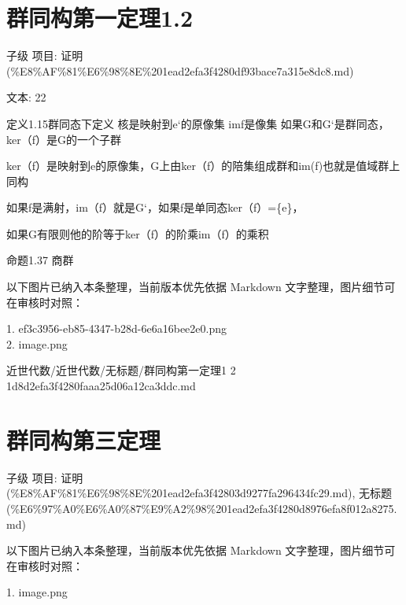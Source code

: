 \section*{群同构第一定理1.2}

\begin{theorem}[群同构第一定理1.2]

子级 项目: 证明 (\%E8\%AF\%81\%E6\%98\%8E\%201ead2efa3f4280df93bace7a315e8dc8.md)

文本: 22

定义1.15群同态下定义 核是映射到e‘的原像集 imf是像集 如果G和G‘是群同态，ker（f）是G的一个子群

ker（f）是映射到e的原像集，G上由ker（f）的陪集组成群和im(f)也就是值域群上同构

如果f是满射，im（f）就是G‘，如果f是单同态ker（f）=\{e\}，

如果G有限则他的阶等于ker（f）的阶乘im（f）的乘积

命题1.37 商群

\end{theorem}

\begin{note}[关联图片]
以下图片已纳入本条整理，当前版本优先依据 Markdown 文字整理，图片细节可在审核时对照：

1. ef3c3956-eb85-4347-b28d-6e6a16bee2e0.png\\
2. image.png\\

\end{note}

\begin{note}[来源路径]

近世代数/近世代数/无标题/群同构第一定理1 2 1d8d2efa3f4280faaa25d06a12ca3ddc.md

\end{note}

\section*{群同构第三定理}

\begin{theorem}[群同构第三定理]

子级 项目: 证明 (\%E8\%AF\%81\%E6\%98\%8E\%201ead2efa3f42803d9277fa296434fc29.md), 无标题 (\%E6\%97\%A0\%E6\%A0\%87\%E9\%A2\%98\%201ead2efa3f4280d8976efa8f012a8275.md)

\end{theorem}

\begin{note}[关联图片]
以下图片已纳入本条整理，当前版本优先依据 Markdown 文字整理，图片细节可在审核时对照：

1. image.png\\

\end{note}

